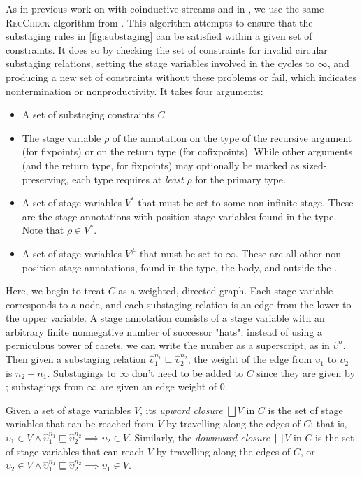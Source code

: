 \documentclass[nonacm,screen,10pt]{acmart}
\begin{document}
As in previous work on \CChatomega with coinductive streams \cite{cc-hat-omega} and in \CIChat, we use the same \textsc{RecCheck} algorithm from \Fhat \cite{f-hat}. This algorithm attempts to ensure that the substaging rules in \autoref{fig:substaging} can be satisfied within a given set of constraints. It does so by checking the set of constraints for invalid circular substaging relations, setting the stage variables involved in the cycles to $\infty$, and producing a new set of constraints without these problems or fail, which indicates nontermination or nonproductivity. It takes four arguments:

\begin{itemize}
    \item A set of substaging constraints $C$.
    \item The stage variable $\rho$ of the annotation on the type of the recursive argument (for fixpoints) or on the return type (for cofixpoints). While other arguments (and the return type, for fixpoints) may optionally be marked as sized-preserving, each \cofixpoint type requires at \textit{least} $\rho$ for the primary \corecursive type.
    \item A set of stage variables $V^*$ that must be set to some non-infinite stage. These are the stage annotations with position stage variables found in the \cofixpoint type. Note that $\rho \in V^*$.
    \item A set of stage variables $V^\neq$ that must be set to $\infty$. These are all other non-position stage annotations, found in the \cofixpoint type, the \cofixpoint body, and outside the \cofixpoint.
\end{itemize}

Here, we begin to treat $C$ as a weighted, directed graph. Each stage variable corresponds to a node, and each substaging relation is an edge from the lower to the upper variable. A stage annotation consists of a stage variable with an arbitrary finite nonnegative number of successor "hats"; instead of using a perniculous tower of carets, we can write the number as a superscript, as in $\hat{\upsilon}^n$. Then given a substaging relation $\hat{\upsilon}_1^{n_1} \sqsubseteq \hat{\upsilon}_2^{n_2}$, the weight of the edge from $\upsilon_1$ to $\upsilon_2$ is $n_2 - n_1$. Substagings to $\infty$ don't need to be added to $C$ since they are given by ; substagings from $\infty$ are given an edge weight of $0$.

Given a set of stage variables $V$, its \textit{upward closure} $\bigsqcup V$ in $C$ is the set of stage variables that can be reached from $V$ by travelling along the edges of $C$; that is, $\upsilon_1 \in V \wedge \hat{\upsilon}_1^{n_1} \sqsubseteq \hat{\upsilon}_2^{n_2} \implies \upsilon_2 \in V$. Similarly, the \textit{downward closure} $\bigsqcap V$ in $C$ is the set of stage variables that can reach $V$ by travelling along the edges of $C$, or $\upsilon_2 \in V \wedge \hat{\upsilon}_1^{n_1} \sqsubseteq \hat{\upsilon}_2^{n_2} \implies \upsilon_1 \in V$.
\end{document}
